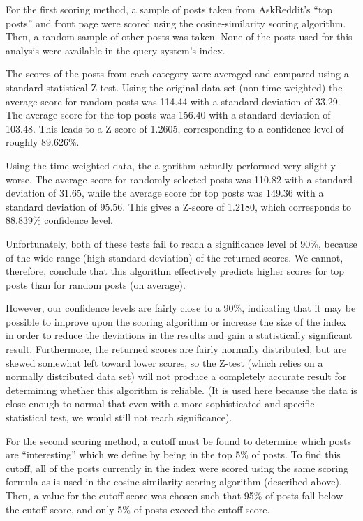 \documentclass{acm_proc_article-sp}
\begin{document}
For the first scoring method, a sample of posts taken from AskReddit's ``top posts'' and front page were scored using the
cosine-similarity scoring algorithm.  Then, a random sample of other posts was taken.  None of the posts used for this
analysis were available in the query system's index.

The scores of the posts from each category were averaged and compared using a standard statistical Z-test.  Using the
original data set (non-time-weighted) the average score for random posts was 114.44 with a standard deviation of 33.29.
The average score for the top posts was 156.40 with a standard deviation of 103.48.  This leads to a Z-score of
1.2605, corresponding to a confidence level of roughly 89.626\%.

Using the time-weighted data, the algorithm actually performed very slightly worse.  The average score for randomly
selected posts was 110.82 with a standard deviation of 31.65, while the average score for top posts was 149.36 with
a standard deviation of 95.56.  This gives a Z-score of 1.2180, which corresponds to 88.839\% confidence level.

Unfortunately, both of these tests fail to reach a significance level of 90\%, because of the wide range (high standard
deviation) of the returned scores.  We cannot, therefore, conclude that this algorithm effectively predicts higher scores
for top posts than for random posts (on average).

However, our confidence levels are fairly close to a 90\%, indicating that it may be possible to improve upon the
scoring algorithm or increase the size of the index in order to reduce the deviations in the results and gain a
statistically significant result.  Furthermore, the returned scores are fairly normally distributed, but are skewed
somewhat left toward lower scores, so the Z-test (which relies on a normally distributed data set) will not produce
a completely accurate result for determining whether this algorithm is reliable.  (It is used here because the data
is close enough to normal that even with a more sophisticated and specific statistical test, we would still not reach
significance).

For the second scoring method, a cutoff must be found to determine which posts are ``interesting'' which we define by
being in the top 5\% of posts.  To find this cutoff, all of the posts currently in the index were scored using the
same scoring formula as is used in the cosine similarity scoring algorithm (described above).  Then, a value for
the cutoff score was chosen such that 95\% of posts fall below the cutoff score, and only 5\% of posts exceed the
cutoff score.
\end{document}
